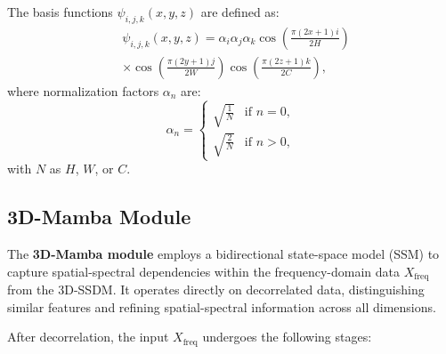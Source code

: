 The basis functions \( \psi_{i,j,k}(x, y, z) \) are defined as:
\begin{equation}
\begin{aligned}
&\psi_{i,j,k}(x, y, z) = \alpha_i \alpha_j \alpha_k \cos\left(\frac{\pi (2x + 1) i}{2H}\right) \\
& \times \cos\left(\frac{\pi (2y + 1) j}{2W}\right) \cos\left(\frac{\pi (2z + 1) k}{2C}\right),
\end{aligned}
\end{equation}
where normalization factors \( \alpha_n \) are:
\[
\alpha_n =
\begin{cases}
\sqrt{\frac{1}{N}} & \text{if } n = 0, \\
\sqrt{\frac{2}{N}} & \text{if } n > 0,
\end{cases}
\]
with \( N \) as \( H \), \( W \), or \( C \).

\subsection{3D-Mamba Module}

The \textbf{3D-Mamba module} employs a bidirectional state-space model (SSM) to capture spatial-spectral dependencies within the frequency-domain data \( X_{\text{freq}} \) from the 3D-SSDM. It operates directly on decorrelated data, distinguishing similar features and refining spatial-spectral information across all dimensions.

After decorrelation, the input \( X_{\text{freq}} \) undergoes the following stages:

